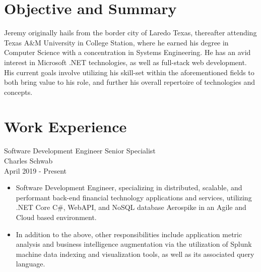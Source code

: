 \documentclass[11pt]{res} %
\begin{document}
 
 

\address{{\bf Current Address} \\   11011 Domain Drive \\   Austin, TX
         78758   \\ (956)286-8386}
\address{{\bf Contact Information} \\ jeremycantu.com \\ github.com/jac21 \\ mail@jeremycantu.com}
 
                                             
\begin{resume}
                                               
 
\section{Objective and Summary}
   Jeremy originally hails from the border city of Laredo Texas, thereafter attending Texas A\&M University in College Station, where he earned his degree in Computer Science with a concentration in Systems Engineering. He has an avid interest in Microsoft .NET technologies, as well as full-stack web development. His current goals involve utilizing his skill-set within the aforementioned fields to both bring value to his role, and further his overall repertoire of technologies and concepts.
 
\section{Work Experience}

Software Development Engineer Senior Specialist \\
Charles Schwab \\
April 2019 - Present
\vspace{0.2in}
   \begin{itemize} \itemsep -2pt  %
   \item Software Development Engineer, specializing in distributed, scalable, and performant back-end financial technology applications and services, utilizing .NET Core C\#, WebAPI, and NoSQL database Aerospike in an Agile and Cloud based environment. 
\newline
    \item In addition to the above, other responsibilities include application metric analysis and business intelligence augmentation via the utilization of Splunk machine data indexing and visualization tools, as well as its associated query language.
 \end{itemize}


\end{resume}
\end{document}

